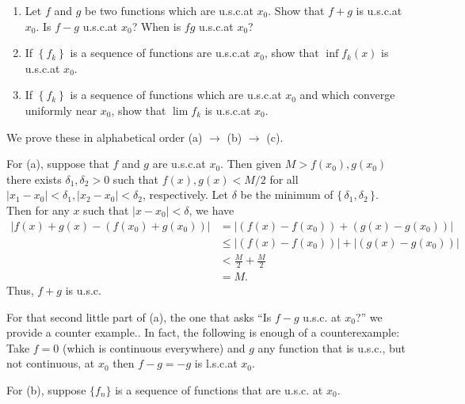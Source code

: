 \begin{problem}
  \hfill
  \begin{enumerate}[label=(\alph*),noitemsep]
  \item Let $f$ and $g$ be two functions which are u.s.c.\@ at $x_0$. Show
    that $f+g$ is u.s.c.\@ at $x_0$. Is $f-g$ u.s.c.\@ at $x_0$? When is
    $fg$ u.s.c.\@ at $x_0$?
  \item If $\left\{f_k\right\}$ is a sequence of functions are u.s.c.\@ at
    $x_0$, show that $\inf f_k(x)$ is u.s.c.\@ at $x_0$.
  \item If $\left\{f_k\right\}$ is a sequence of functions which are
    u.s.c.\@ at $x_0$ and which converge uniformly near $x_0$, show that
    $\lim f_k$ is u.s.c.\@ at $x_0$.
  \end{enumerate}
\end{problem}
\begin{solution}
  We prove these in alphabetical order (a) $\to$ (b) $\to$ (c).

  For (a), suppose that $f$ and $g$ are u.s.c.\@ at $x_0$. Then given
  $M>f(x_0),g(x_0)$ there exists $\delta_1,\delta_2>0$ such that
  $f(x),g(x)<M/2$ for all $|x_1-x_0|<\delta_1,|x_2-x_0|<\delta_2$,
  respectively. Let $\delta$ be the minimum of
  $\{\,\delta_1,\delta_2\,\}$. Then for any $x$ such that $|x-x_0|<\delta$,
  we have
  \begin{align*}
    |f(x)+g(x)-(f(x_0)+g(x_0))|
    &=|(f(x)-f(x_0))+(g(x)-g(x_0))|\\
    &\leq |(f(x)-f(x_0))|+|(g(x)-g(x_0))|\\
    &<\frac{M}{2}+\frac{M}{2}\\
    &=M.
  \end{align*}
  Thus, $f+g$ is u.s.c.

  For that second little part of (a), the one that asks ``Is $f-g$ u.s.c.\@
  at $x_0$?'' we provide a counter example.. In fact, the following is enough of a
  counterexample: Take $f=0$ (which is continuous everywhere) and $g$ any
  function that is u.s.c.\@, but not continuous, at $x_0$ then $f-g=-g$ is
  l.s.c.\@ at $x_0$.

  For (b), suppose $\{f_n\}$ is a sequence of functions that are u.s.c.\@
  at $x_0$.
\end{solution}

